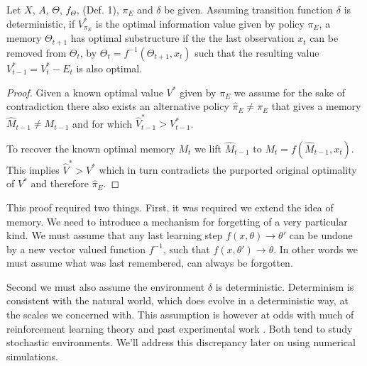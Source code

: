 \begin{theorem} \label{theorem:opt_sub} 
    Let $X$, $A$, $\Theta$, $f_{\Theta}$, (Def. 1), $\pi_E$ and $\delta$ be given. Assuming transition function $\delta$ is deterministic, if $V^*_{\pi_E}$ is the optimal information value given by policy $\pi_E$, a memory $\Theta_{t+1}$ has optimal substructure if the the last observation $x_t$ can be removed from $\Theta_t$, by $\Theta_{t} = f^{-1}(\Theta_{t+1}, x_t)$ such that the resulting value $V^*_{t-1} = V^*_{t} - E_{t}$ is also optimal. 
\end{theorem}
\begin{proof}
	Given a known optimal value $V^*$ given by $\pi_E$ we assume for the sake of contradiction there also exists an alternative policy $\hat \pi_E \neq \pi_E$ that gives a memory $\hat M_{t-1} \neq M_{t-1}$ and for which $\hat V^*_{t-1} > V^*_{t-1}$. 
	
	To recover the known optimal memory $M_t$ we lift $\hat M_{t-1}$ to $M_t = f(\hat M_{t-1}, x_t)$. This implies $\hat V^* > V^*$ which in turn contradicts the purported original optimality of $V^*$ and therefore $\hat \pi_E$.
\end{proof}

This proof required two things. First, it was required we extend the idea of memory. We need to introduce a mechanism for forgetting of a very particular kind. We must assume that any last learning step $f(x, \theta) \rightarrow \theta'$ can be undone by a new vector valued function $f^{-1}$, such that $f(x, \theta') \rightarrow \theta$. In other words we must assume what was last remembered, can always be forgotten. 

Second we must also assume the environment $\delta$ is deterministic. Determinism is consistent with the natural world, which does evolve in a deterministic way, at the scales we concerned with. This assumption is however at odds with much of reinforcement learning theory \citep{needed} and past experimental work \citep{needed}. Both tend to study stochastic environments. We'll address this discrepancy later on using numerical simulations.

